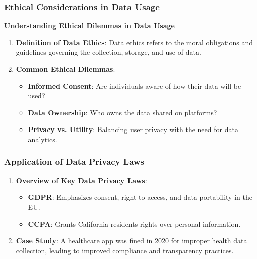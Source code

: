 \documentclass[aspectratio=169]{beamer}
\begin{document}
\begin{frame}[fragile]
    \frametitle{Ethical Considerations in Data Usage}
    
    \textbf{Understanding Ethical Dilemmas in Data Usage}
    
    \begin{enumerate}
        \item \textbf{Definition of Data Ethics}: 
        Data ethics refers to the moral obligations and guidelines governing the collection, storage, and use of data.
        
        \item \textbf{Common Ethical Dilemmas}:
        \begin{itemize}
            \item \textbf{Informed Consent}: Are individuals aware of how their data will be used?
            \item \textbf{Data Ownership}: Who owns the data shared on platforms?
            \item \textbf{Privacy vs. Utility}: Balancing user privacy with the need for data analytics.
        \end{itemize}
    \end{enumerate}
\end{frame}

\begin{frame}[fragile]
    \frametitle{Application of Data Privacy Laws}
    
    \begin{enumerate}
        \item \textbf{Overview of Key Data Privacy Laws}:
        \begin{itemize}
            \item \textbf{GDPR}: Emphasizes consent, right to access, and data portability in the EU.
            \item \textbf{CCPA}: Grants California residents rights over personal information.
        \end{itemize}
        
        \item \textbf{Case Study}: 
        A healthcare app was fined in 2020 for improper health data collection, leading to improved compliance and transparency practices.
    \end{enumerate}
\end{frame}
\end{document}
